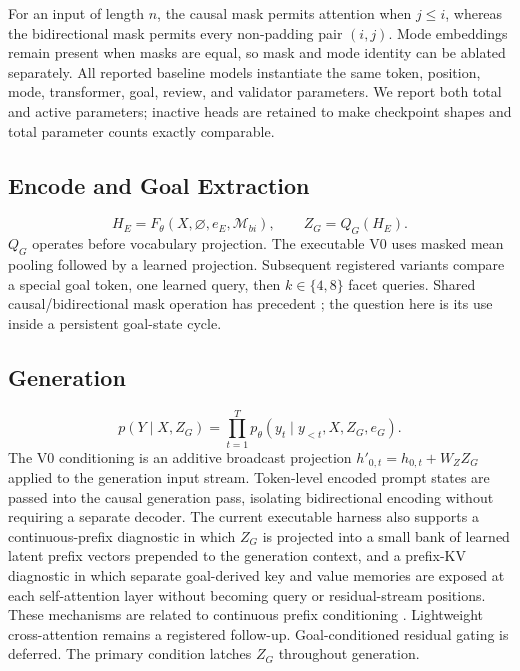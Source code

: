 \documentclass[11pt]{article}
\begin{document}
For an input of length $n$, the causal mask permits attention when $j\leq i$, whereas the bidirectional mask permits every non-padding pair $(i,j)$. Mode embeddings remain present when masks are equal, so mask and mode identity can be ablated separately. All reported baseline models instantiate the same token, position, mode, transformer, goal, review, and validator parameters. We report both total and active parameters; inactive heads are retained to make checkpoint shapes and total parameter counts exactly comparable.

\subsection{Encode and Goal Extraction}
\begin{equation}
H_E=F_\theta(X,\varnothing,e_E,\mathcal M_{bi}),\qquad Z_G=Q_G(H_E).
\end{equation}
$Q_G$ operates before vocabulary projection. The executable V0 uses masked mean pooling followed by a learned projection. Subsequent registered variants compare a special goal token, one learned query, then $k\in\{4,8\}$ facet queries. Shared causal/bidirectional mask operation has precedent \citep{dong2019unified}; the question here is its use inside a persistent goal-state cycle.

\subsection{Generation}
\begin{equation}
p(Y\mid X,Z_G)=\prod_{t=1}^{T}p_\theta(y_t\mid y_{<t},X,Z_G,e_G).
\end{equation}
The V0 conditioning is an additive broadcast projection $h'_{0,t}=h_{0,t}+W_ZZ_G$ applied to the generation input stream. Token-level encoded prompt states are passed into the causal generation pass, isolating bidirectional encoding without requiring a separate decoder. The current executable harness also supports a continuous-prefix diagnostic in which $Z_G$ is projected into a small bank of learned latent prefix vectors prepended to the generation context, and a prefix-KV diagnostic in which separate goal-derived key and value memories are exposed at each self-attention layer without becoming query or residual-stream positions. These mechanisms are related to continuous prefix conditioning \citep{li2021prefixtuning}. Lightweight cross-attention remains a registered follow-up. Goal-conditioned residual gating is deferred. The primary condition latches $Z_G$ throughout generation.
\end{document}

